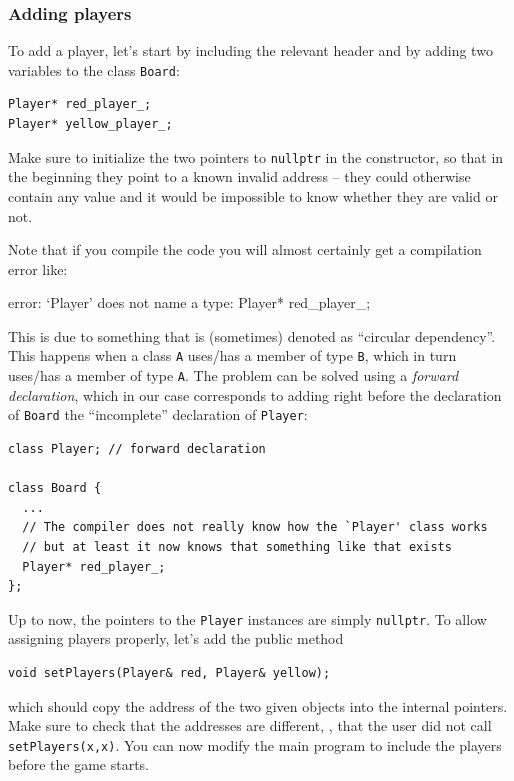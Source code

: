 \documentclass{article}
\begin{document}
\subsubsection{Adding players}

To add a player, let's start by including the relevant header and by adding two variables to the class \texttt{Board}:
\begin{center}
\begin{minipage}{.9\textwidth}
\begin{lstlisting}[style=mycpp,numbers=none]
Player* red_player_;
Player* yellow_player_;
\end{lstlisting}
\end{minipage}
\end{center}
Make sure to initialize the two pointers to \texttt{nullptr} in the constructor, so that in the beginning they point to a known invalid address -- they could otherwise contain any value and it would be impossible to know whether they are valid or not.

Note that if you compile the code you will almost certainly get a compilation error like:
\begin{center}
  \ttfamily
  error: `Player' does not name a type: Player* red\_player\_;
\end{center}
This is due to something that is (sometimes) denoted as ``circular dependency''. This happens when a class \texttt{A} uses/has a member of type \texttt{B}, which in turn uses/has a member of type \texttt{A}. The problem can be solved using a \emph{forward declaration}, which in our case corresponds to adding right before the declaration of \texttt{Board} the ``incomplete'' declaration of \texttt{Player}:
\begin{center}
\begin{minipage}{.9\textwidth}
\begin{lstlisting}[style=mycpp,numbers=none]
class Player; // forward declaration

class Board {
  ...
  // The compiler does not really know how the `Player' class works
  // but at least it now knows that something like that exists
  Player* red_player_;
};
\end{lstlisting}
\end{minipage}
\end{center}

Up to now, the pointers to the \texttt{Player} instances are simply \texttt{nullptr}. To allow assigning players properly, let's add the public method
\begin{center}
\begin{minipage}{.9\textwidth}
\begin{lstlisting}[style=mycpp,numbers=none]
void setPlayers(Player& red, Player& yellow);
\end{lstlisting}
\end{minipage}
\end{center}
which should copy the address of the two given objects into the internal pointers. Make sure to check that the addresses are different, \ie, that the user did not call \texttt{setPlayers(x,x)}. You can now modify the main program to include the players before the game starts.
\end{document}
